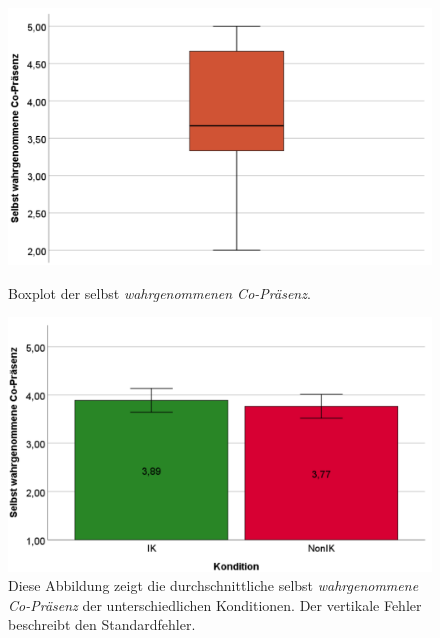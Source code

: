 \documentclass[a4paper,11pt]{article}%
\renewcommand{\\}{\vspace*{0.5\baselineskip} \newline}
\begin{document}
{{{{{{{{{{{{{{{{	\begin{figure}[H]
   \begin{minipage}[t]{.5\linewidth} %
      \includegraphics[width=\linewidth]{Abbildungen/AuswertungDiagramme/Final/BP_SelfCoPresence.png}
      \caption[Boxplot der selbst wahrgenommenen Co-Präsenz]{Boxplot der selbst \textit{wahrgenommenen Co-Präsenz}.}
            \label{SD_SelfCoPresenceBP}
   \end{minipage}
   \hspace{.02\linewidth}%
   \begin{minipage}[t]{.5\linewidth} %
     \includegraphics[width=\linewidth]{Abbildungen/AuswertungDiagramme/Final/SD_SelbstCoPresence_Mittelwerte.png}
      \caption[Durchschnittlich selbst wahrgenommene Co-Präsenz der Konditionen]{Diese Abbildung zeigt die durchschnittliche selbst \textit{wahrgenommene Co-Präsenz} der unterschiedlichen Konditionen. Der vertikale Fehler beschreibt den Standardfehler.}
       \label{SD_SelbstCoPresence_Mittelwerte}
   \end{minipage}
\end{figure}

}}}}}}}}}}}}}}}}
\end{document}
